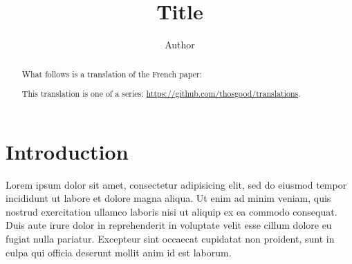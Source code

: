 \documentclass[10pt]{article}
\theoremstyle{plain}
\theoremstyle{definition}
\begin{document}
\renewcommand{\abstractname}{Translator's note.}

\title{Title}
\author{Author}
\date{}
\maketitle

\begin{abstract}
  What follows is a translation of the French paper:

  \smallskip\noindent

  \smallskip
  This translation is one of a series: {\footnotesize\url{https://github.com/thosgood/translations}.}
\end{abstract}

\tableofcontents



\section*{Introduction}
Lorem ipsum dolor sit amet, consectetur adipisicing elit, sed do eiusmod
tempor incididunt ut labore et dolore magna aliqua. Ut enim ad minim veniam,
quis nostrud exercitation ullamco laboris nisi ut aliquip ex ea commodo
consequat. Duis aute irure dolor in reprehenderit in voluptate velit esse
cillum dolore eu fugiat nulla pariatur. Excepteur sint occaecat cupidatat non
proident, sunt in culpa qui officia deserunt mollit anim id est laborum.



\nocite{*}


\end{document}

